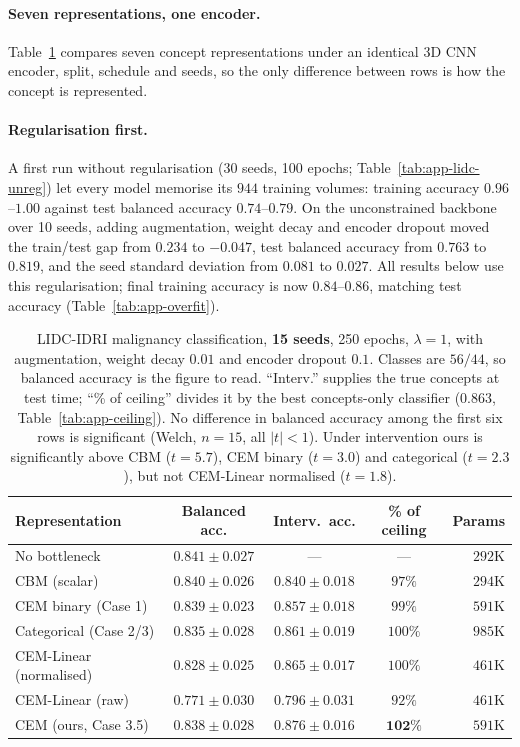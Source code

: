\documentclass[11pt]{article}
\begin{document}
\paragraph{Seven representations, one encoder.}
Table~\ref{tab:lidcresults} compares seven concept representations under an
identical 3D CNN encoder, split, schedule and seeds, so the only difference
between rows is how the concept is represented.

\paragraph{Regularisation first.}
A first run without regularisation (30 seeds, 100 epochs;
Table~\ref{tab:app-lidc-unreg}) let every model memorise its $944$ training
volumes: training accuracy $0.96$--$1.00$ against test balanced accuracy
$0.74$--$0.79$. On the unconstrained backbone over 10 seeds, adding
augmentation, weight decay and encoder dropout moved the train/test gap from
$0.234$ to $-0.047$, test balanced accuracy from $0.763$ to $0.819$, and the
seed standard deviation from $0.081$ to $0.027$. All results below use this
regularisation; final training accuracy is now $0.84$--$0.86$, matching test
accuracy (Table~\ref{tab:app-overfit}).

\begin{table}[t]
\centering
\caption{LIDC-IDRI malignancy classification, \textbf{15 seeds}, 250 epochs,
$\lambda = 1$, with augmentation, weight decay $0.01$ and encoder dropout
$0.1$. Classes are $56/44$, so balanced accuracy is the figure to read.
``Interv.'' supplies the true concepts at test time; ``\% of ceiling'' divides
it by the best concepts-only classifier ($0.863$,
Table~\ref{tab:app-ceiling}). No difference in balanced accuracy among the
first six rows is significant (Welch, $n=15$, all $|t| < 1$). Under
intervention ours is significantly above CBM ($t = 5.7$), CEM binary
($t = 3.0$) and categorical ($t = 2.3$), but not CEM-Linear normalised
($t = 1.8$).}
\label{tab:lidcresults}
\begin{tabular}{lcccr}
\toprule
\textbf{Representation} & \textbf{Balanced acc.} & \textbf{Interv.\ acc.} &
\textbf{\% of ceiling} & \textbf{Params} \\
\midrule
No bottleneck            & $\mathbf{0.841 \pm 0.027}$ & --- & --- & $292$K \\
\midrule
CBM (scalar)             & $0.840 \pm 0.026$ & $0.840 \pm 0.018$ & $97\%$ & $294$K \\
CEM binary (Case 1)      & $0.839 \pm 0.023$ & $0.857 \pm 0.018$ & $99\%$ & $591$K \\
Categorical (Case 2/3)   & $0.835 \pm 0.028$ & $0.861 \pm 0.019$ & $100\%$ & $985$K \\
CEM-Linear (normalised)  & $0.828 \pm 0.025$ & $0.865 \pm 0.017$ & $100\%$ & $461$K \\
CEM-Linear (raw)         & $0.771 \pm 0.030$ & $0.796 \pm 0.031$ & $92\%$ & $461$K \\
CEM (ours, Case 3.5)     & $0.838 \pm 0.028$ & $\mathbf{0.876 \pm 0.016}$ & $\mathbf{102\%}$ & $591$K \\
\bottomrule
\end{tabular}
\end{table}
\end{document}
